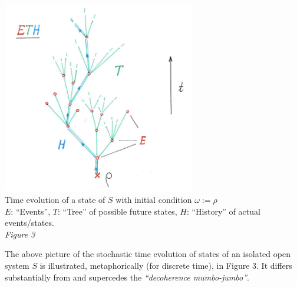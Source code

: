 \documentclass[12pt]{article}
\begin{document}
\begin{center}
\includegraphics[height=8.4cm]{ETH-new.png}\\
Time evolution of a state of $S$ with initial condition $\omega:= \rho$\\
{\color{red}$E$}: ``Events'', {\color{caribbeangreen}$T$}: ``Tree'' of possible future states, {\color{blue}$H$}: ``History'' of actual events/states.\\ 
\textit{Figure 3}
\end{center}
The above picture of the stochastic time evolution of states of an isolated open system $S$ is illustrated, metaphorically (for discrete time), in Figure 3. It differs substantially from and supercedes the \textit{``decoherence mumbo-jumbo''}.
\end{document}
